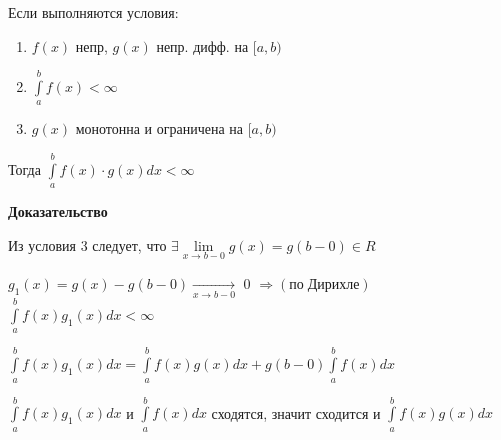 \documentclass[a4paper,12pt]{article} %
\begin{document}
Если выполняются условия:

\begin{enumerate}
    \item $f(x)$ непр, $g(x)$ непр. дифф. на $[a, b)$
    
    \item $\int\limits_{a}^{b}f(x) < \infty$
    
    \item $g(x)$ монотонна и ограничена на $[a, b)$ 

\end{enumerate}

Тогда $\int\limits_a^b f(x)\cdot g(x) dx < \infty$

\textbf{Доказательство}

Из условия 3 следует, что $\exists\lim\limits_{x\rightarrow b-0}g(x) = g(b-0) \in R$

$g_1(x) = g(x) - g(b-0) \xrightarrow[x \to b-0]{}$ 0 $\Rightarrow(по\; Дирихле)$ $\int\limits_a^b f(x)g_1(x) dx < \infty$

$\int\limits_a^b f(x)g_1(x)dx = \int\limits_a^b f(x)g(x)dx+g(b-0)\int\limits_a^b f(x)dx$

$\int\limits_a^b f(x)g_1(x)dx$ и $\int\limits_a^b f(x)dx$ сходятся, значит сходится и $\int\limits_a^b f(x)g(x)dx$










 
\end{document}
